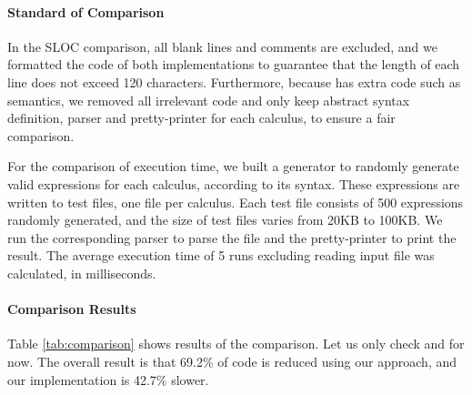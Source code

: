 \paragraph{Standard of Comparison}
In the SLOC comparison, all blank lines and comments are excluded,
and we formatted the code of both implementations to guarantee that
the length of each line does not exceed 120 characters. Furthermore,
because \ilyaimpl{} has extra code such as semantics,
we removed all irrelevant code and only keep abstract
syntax definition, parser and pretty-printer for each calculus, to
ensure a fair comparison.

For the comparison of execution time, we built a generator to randomly
generate valid expressions for each calculus, according to its syntax. These expressions are
written to test files, one file per calculus. Each test file consists of 500
expressions randomly generated, and the size of test files varies from 20KB to 100KB.
We run the corresponding parser to parse the file and the pretty-printer to print the result.
The average execution time of 5 runs excluding reading input file was calculated, in milliseconds.

\begin{table}
    \centering
    \caption{Comparison of SLOC and execution time.}
    \label{tab:comparison}
    \vspace{-0.3cm}
\end{table}

\paragraph{Comparison Results}
Table \ref{tab:comparison} shows results of the comparison.
Let us only check \ourimpl{} and \ilyaimpl{} for now.
The overall result is that 69.2\% of code is reduced using our
approach, and our implementation is 42.7\% slower.

